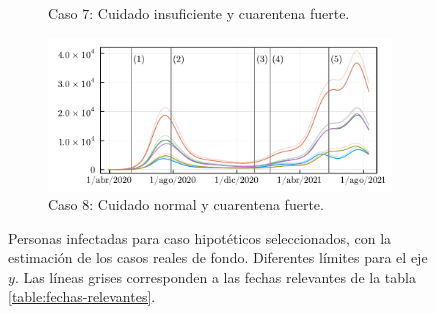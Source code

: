 \begin{figure}
\begin{subfigure}[b]{.47\textwidth}
         \caption{Caso \(7\): Cuidado insuficiente y cuarentena fuerte.}
     \end{subfigure}
     \hfill
     \begin{subfigure}[b]{.47\textwidth}
         \centering
         \includegraphics[width=\textwidth]{img/resultados/comparecase_8withnormal_I_gamma_e_0-1724_gamma_i_0-0833_beta_2_2-0000.pdf}
         \caption{Caso \(8\): Cuidado normal y cuarentena fuerte.}
     \end{subfigure}
        \caption[Personas infectadas para caso hipotéticos seleccionados.]{Personas infectadas para caso hipotéticos seleccionados, con la estimación de los casos reales de fondo. Diferentes límites para el eje \(y\). Las líneas grises corresponden a las fechas relevantes de la tabla \ref{table:fechas-relevantes}.}
        \label{img:hip-3478-I-comp-beta1-2}
\end{figure}

